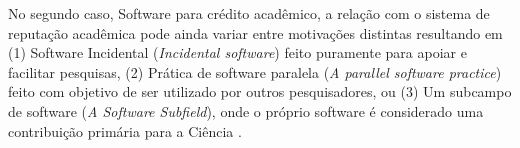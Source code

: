 No segundo caso, Software para crédito acadêmico, a relação com o sistema de
reputação acadêmica pode ainda variar entre motivações distintas resultando em
(1) Software Incidental ({\it Incidental software})
feito puramente para apoiar e facilitar pesquisas,
(2) Prática de software paralela ({\it A parallel software practice})
feito com objetivo de ser utilizado por outros pesquisadores, ou
(3) Um subcampo de software ({\it A Software Subfield}),
onde o próprio software é considerado uma contribuição primária para a Ciência
\cite{howison2011scientific}.





%
%

%

